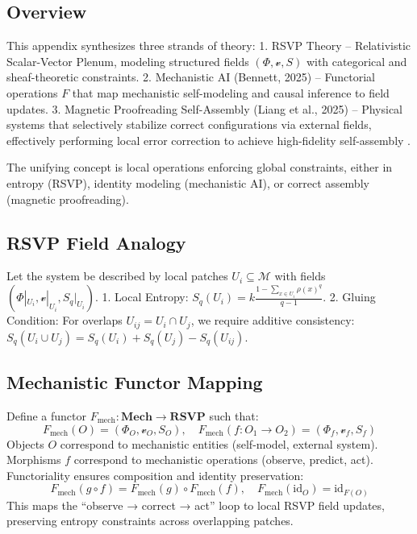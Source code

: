 \documentclass{article}
\begin{document}
\subsection{Overview}
This appendix synthesizes three strands of theory:
1. RSVP Theory – Relativistic Scalar-Vector Plenum, modeling structured fields $(\Phi, \mathcal{v}, S)$ with categorical and sheaf-theoretic constraints.
2. Mechanistic AI (Bennett, 2025) – Functorial operations $F$ that map mechanistic self-modeling and causal inference to field updates.
3. Magnetic Proofreading Self-Assembly (Liang et al., 2025) – Physical systems that selectively stabilize correct configurations via external fields, effectively performing local error correction to achieve high-fidelity self-assembly \cite{Liang2025}.

The unifying concept is local operations enforcing global constraints, either in entropy (RSVP), identity modeling (mechanistic AI), or correct assembly (magnetic proofreading).

\subsection{RSVP Field Analogy}
Let the system be described by local patches $U_i \subseteq \mathcal{M}$ with fields $(\Phi|_{U_i}, \mathcal{v}|_{U_i}, S_q|_{U_i})$.
1. Local Entropy: $S_q(U_i) = k \frac{1 - \sum_{x \in U_i} \rho(x)^q}{q-1}$.
2. Gluing Condition: For overlaps $U_{ij} = U_i \cap U_j$, we require additive consistency: $S_q(U_i \cup U_j) = S_q(U_i) + S_q(U_j) - S_q(U_{ij})$.

\subsection{Mechanistic Functor Mapping}
Define a functor $F_\text{mech}: \mathbf{Mech} \to \mathbf{RSVP}$ such that:
\[
F_\text{mech}(O) = (\Phi_O, \mathcal{v}_O, S_O), \quad F_\text{mech}(f: O_1 \to O_2) = (\Phi_f, \mathcal{v}_f, S_f)
\]
Objects $O$ correspond to mechanistic entities (self-model, external system). Morphisms $f$ correspond to mechanistic operations (observe, predict, act). Functoriality ensures composition and identity preservation:
\[
F_\text{mech}(g \circ f) = F_\text{mech}(g) \circ F_\text{mech}(f), \quad F_\text{mech}(\text{id}_O) = \text{id}_{F(O)}
\]
This maps the “observe → correct → act” loop to local RSVP field updates, preserving entropy constraints across overlapping patches.
\end{document}
